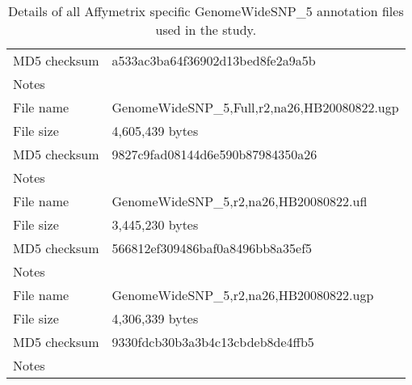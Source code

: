 \documentclass[10pt,a4paper]{article}
\begin{document}
\begin{table}[htp]
\begin{center}
\begin{tabular}{lp{}}
MD5 checksum & a533ac3ba64f36902d13bed8fe2a9a5b \\
Notes        &  \\
\hline
File name    & GenomeWideSNP\_5,Full,r2,na26,HB20080822.ugp \\
File size    & 4,605,439 bytes \\
MD5 checksum & 9827c9fad08144d6e590b87984350a26 \\
Notes        &  \\
\hline
File name    & GenomeWideSNP\_5,r2,na26,HB20080822.ufl \\
File size    & 3,445,230 bytes \\
MD5 checksum & 566812ef309486baf0a8496bb8a35ef5 \\
Notes        &  \\
\hline
File name    & GenomeWideSNP\_5,r2,na26,HB20080822.ugp \\
File size    & 4,306,339 bytes \\
MD5 checksum & 9330fdcb30b3a3b4c13cbdeb8de4ffb5 \\
Notes        &  \\
\hline
\end{tabular}
\end{center}
\caption{Details of all Affymetrix specific GenomeWideSNP\_5 annotation files used in the study.}
\label{tblGWSFIveAffymetrix}
\end{table}
\end{document}
